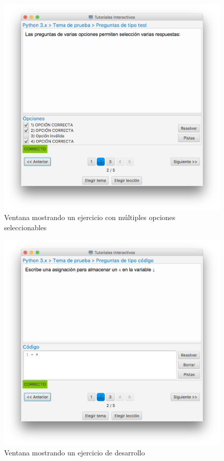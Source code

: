 \documentclass[]{article}
\begin{document}
%
\begin{figure}[tbp]
\begin{center}
\includegraphics[scale=0.35,trim={50px 70px 50px 30px},clip]{l_5.png}
\end{center}
\caption{Ventana mostrando un ejercicio con múltiples opciones seleccionables\label{fig:l_5}}
\end{figure}
%

%
\begin{figure}[tbp]
\begin{center}
\includegraphics[scale=0.35,trim={50px 70px 50px 30px}, clip]{l_6.png}
\end{center}
\caption{Ventana mostrando un ejercicio de desarrollo\label{fig:l_6}}
\end{figure}
%
\end{document}
